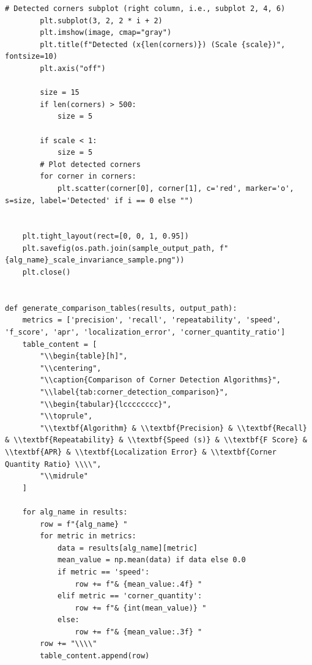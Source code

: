 \documentclass[journal]{IEEEtran}
\begin{document}
\begin{lstlisting}[style=python, caption={Utility Functions for Data Processing}, label={lst:utilities}]
        # Detected corners subplot (right column, i.e., subplot 2, 4, 6)
        plt.subplot(3, 2, 2 * i + 2)
        plt.imshow(image, cmap="gray")
        plt.title(f"Detected (x{len(corners)}) (Scale {scale})", fontsize=10)
        plt.axis("off")
        
        size = 15
        if len(corners) > 500:
            size = 5
        
        if scale < 1:
            size = 5
        # Plot detected corners
        for corner in corners:
            plt.scatter(corner[0], corner[1], c='red', marker='o', s=size, label='Detected' if i == 0 else "")
        
    
    plt.tight_layout(rect=[0, 0, 1, 0.95])
    plt.savefig(os.path.join(sample_output_path, f"{alg_name}_scale_invariance_sample.png"))
    plt.close()
    

def generate_comparison_tables(results, output_path):
    metrics = ['precision', 'recall', 'repeatability', 'speed', 'f_score', 'apr', 'localization_error', 'corner_quantity_ratio']
    table_content = [
        "\\begin{table}[h]",
        "\\centering",
        "\\caption{Comparison of Corner Detection Algorithms}",
        "\\label{tab:corner_detection_comparison}",
        "\\begin{tabular}{lcccccccc}",
        "\\toprule",
        "\\textbf{Algorithm} & \\textbf{Precision} & \\textbf{Recall} & \\textbf{Repeatability} & \\textbf{Speed (s)} & \\textbf{F Score} & \\textbf{APR} & \\textbf{Localization Error} & \\textbf{Corner Quantity Ratio} \\\\",
        "\\midrule"
    ]
    
    for alg_name in results:
        row = f"{alg_name} "
        for metric in metrics:
            data = results[alg_name][metric]
            mean_value = np.mean(data) if data else 0.0
            if metric == 'speed':
                row += f"& {mean_value:.4f} "
            elif metric == 'corner_quantity':
                row += f"& {int(mean_value)} "
            else:
                row += f"& {mean_value:.3f} "
        row += "\\\\"
        table_content.append(row)
    

\end{lstlisting}
\end{document}
